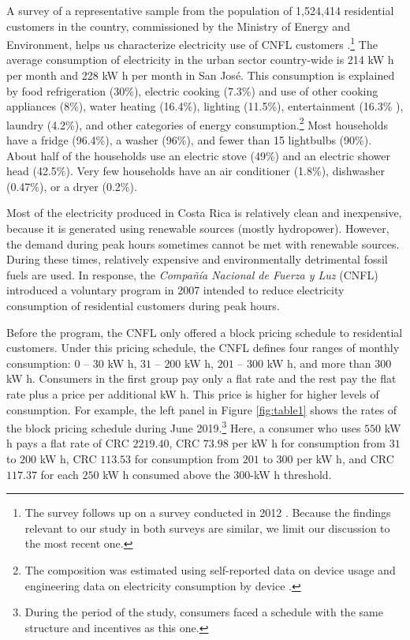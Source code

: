 \documentclass[12pt]{article}
\begin{document}
A survey of a representative sample from the population of 1,524,414 residential customers in the country, commissioned by the Ministry of Energy and Environment, helps us characterize electricity use of CNFL customers \citep{ministeriodeambienteyenergiaEstudioParaCaracterizacion2019}.\footnote{ The survey follows up on a survey conducted in 2012 \citep{ministeriodeambienteyenergiaEncuestaConsumoEnergetico2012}. Because the findings relevant to our study in both surveys are similar, we limit our discussion to the most recent one.} The average consumption of electricity in the urban sector country-wide is 214 kW h per month and 228 kW h per month in San José. This consumption is explained by food refrigeration (30\%),  electric cooking (7.3\%) and use of other cooking appliances (8\%), water heating (16.4\%), lighting (11.5\%), entertainment (16.3\% ), laundry (4.2\%), and other categories of energy consumption.\footnote{The composition was estimated using self-reported data on device usage and engineering data on electricity consumption by device \citep{ministeriodeambienteyenergiaEstudioParaCaracterizacion2019}.} Most households have a fridge (96.4\%), a washer (96\%), and fewer than 15 lightbulbs (90\%). About half of the households use an electric stove (49\%) and an electric shower head (42.5\%). Very few households have an air conditioner (1.8\%), dishwasher (0.47\%), or a dryer (0.2\%).

Most of the electricity produced in Costa Rica is relatively clean and inexpensive, because it is generated using renewable sources (mostly hydropower). However, the demand during peak hours sometimes cannot be met with renewable sources. During these times, relatively expensive and environmentally detrimental fossil fuels are used. In response, the \emph{Compañía Nacional de Fuerza y Luz} (CNFL) introduced a voluntary program in 2007 intended to reduce electricity consumption of residential customers during peak hours.

Before the program, the CNFL only offered a block pricing schedule to residential customers. Under this pricing schedule, the CNFL defines four ranges of monthly consumption: $0$ – $30$ kW h, $31$ – $200$ kW h, $201$ – $300$ kW h, and more than $300$ kW h. Consumers in the first group pay only a flat rate and the rest pay the flat rate plus a price per additional kW h. This price is higher for higher levels of consumption. For example, the left panel in Figure \ref{fig:table1} shows the rates of the block pricing schedule during June 2019.\footnote{During the period of the study, consumers faced a schedule with the same structure and incentives as this one.} Here, a consumer who uses $550$ kW h pays a flat rate of  CRC $2219.40$, CRC $73.98$ per kW h for consumption from $31$ to $200$ kW h, CRC $113.53$ for consumption from $201$ to $300$ per kW h, and CRC $117.37$ for each $250$ kW h consumed above the $300$-kW h threshold.
\end{document}
